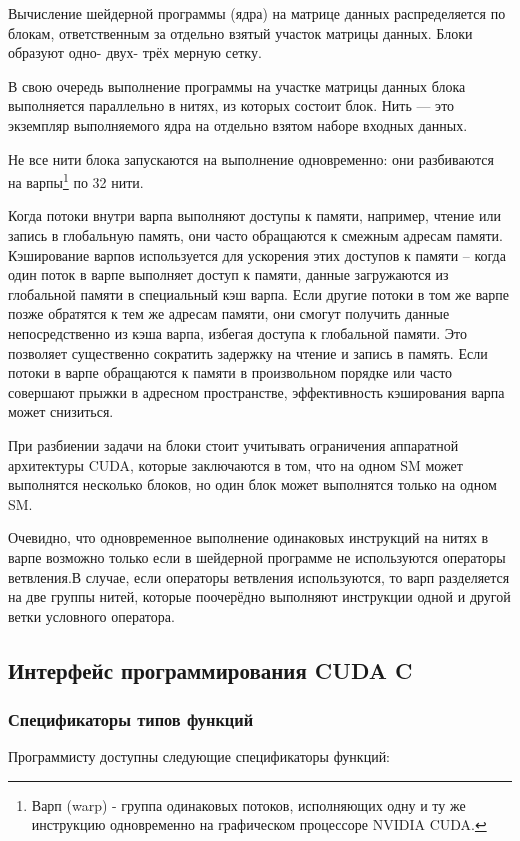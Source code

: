 \documentclass[a4paper, final]{article}
\begin{document}
    Вычисление шейдерной программы (ядра) на матрице данных распределяется по блокам, ответственным за отдельно взятый участок матрицы данных. Блоки образуют одно- двух- трёх мерную сетку.
    
    В свою очередь выполнение программы на участке матрицы данных блока выполняется параллельно в нитях, из которых состоит блок. Нить — это экземпляр выполняемого ядра на отдельно взятом наборе входных данных. 
    
    Не все нити блока запускаются на выполнение одновременно: они разбиваются на варпы\footnote{Варп (warp) - группа одинаковых потоков, исполняющих одну и ту же инструкцию одновременно на графическом процессоре NVIDIA CUDA.} по 32 нити. 

    Когда потоки внутри варпа выполняют доступы к памяти, например, чтение или запись в глобальную память, они часто обращаются к смежным адресам памяти. Кэширование варпов используется для ускорения этих доступов к памяти --  когда один поток в варпе выполняет доступ к памяти, данные загружаются из глобальной памяти в специальный кэш варпа. Если другие потоки в том же варпе позже обратятся к тем же адресам памяти, они смогут получить данные непосредственно из кэша варпа, избегая доступа к глобальной памяти. Это позволяет существенно сократить задержку на чтение и запись в память. Если потоки в варпе обращаются к памяти в произвольном порядке или часто совершают прыжки в адресном пространстве, эффективность кэширования варпа может снизиться.
    
    При разбиении задачи на блоки стоит учитывать ограничения аппаратной архитектуры CUDA, которые заключаются в том, что на одном SM может выполнятся несколько блоков, но один блок может выполнятся только на одном SM.
    
    Очевидно, что одновременное выполнение одинаковых инструкций на нитях в варпе возможно только если в шейдерной программе не используются операторы ветвления.В случае, если операторы ветвления используются, то варп разделяется на две группы нитей, которые поочерёдно выполняют инструкции одной и другой ветки условного оператора.

    \subsection{Интерфейс программирования CUDA C}
     \subsubsection{Спецификаторы типов функций} 
     Программисту доступны следующие спецификаторы функций:
\end{document}
